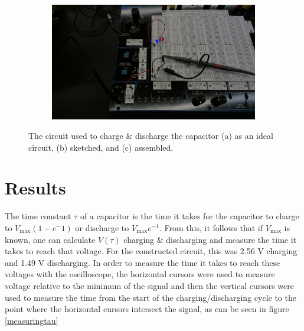 \documentclass{article}
\begin{document}
\begin{figure}[H]
\begin{subfigure}{\textwidth/3}
                \includegraphics[width=\linewidth]{circuit.jpg}
                \caption{}
            \end{subfigure}
            \caption{The circuit used to charge \& discharge the capacitor (a) as an ideal circuit, (b) sketched, and (c) assembled.}
            \label{circuitry}
        \end{figure}


\section{Results}
    The time constant $\tau$ of a capacitor is the time it takes for the capacitor to charge to $V_\mathrm{max}(1-e^-1)$ or discharge to $V_\mathrm{max}e^{-1}$. From this, it follows that if $V_\mathrm{max}$ is known, one can calculate $V(\tau)$ charging \& discharging and measure the time it takes to reach that voltage.
    For the constructed circuit, this was 2.56 V charging and 1.49 V discharging.
    In order to measure the time it takes to reach these voltages with the oscilloscope, the horizontal cursors were used to measure voltage relative to the minimum of the signal and then the vertical cursors were used to measure the time from the start of the charging/discharging cycle to the point where the horizontal cursors intersect the signal, as can be seen in figure \ref{measuringtau}\\
\end{document}
